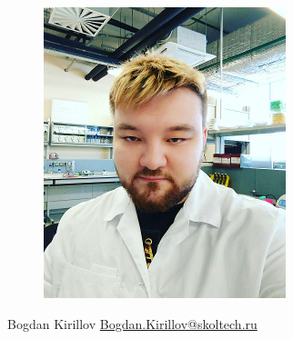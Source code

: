 \documentclass[11pt,xcolor=x11names,compress]{beamer}
\renewcommand{\(}{\begin{columns}}
\renewcommand{\)}{\end{columns}}
\newcommand{\<}[1]{\begin{column}{#1}}
\renewcommand{\>}{\end{column}}
\begin{document}
\begin{frame}
\begin{columns}
\begin{column}{0.33\textwidth}
\begin{figure}
			\includegraphics[width=\textwidth]{Bogdan.jpg}
		\end{figure}
		\centering
		Bogdan Kirillov \newline
		\url{Bogdan.Kirillov@skoltech.ru}
	\end{column}
	\begin{column}{0.33\textwidth}
		\small
		\begin{figure}

\end{figure}
\end{column}
\end{columns}
\end{frame}
\end{document}
